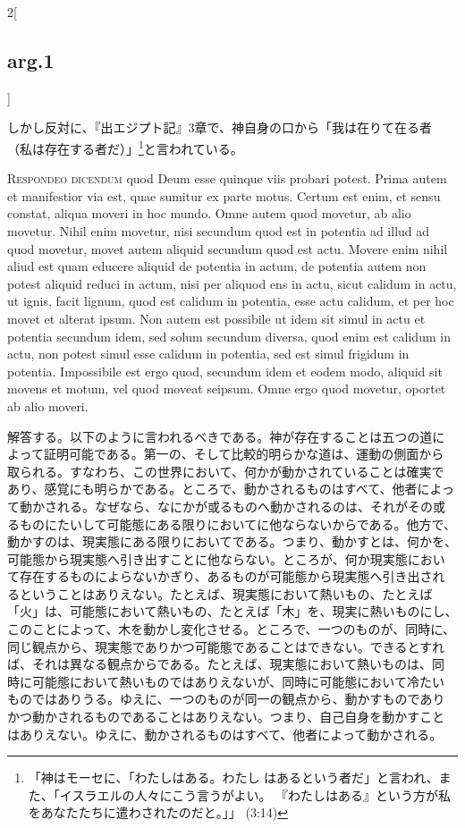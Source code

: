 \documentclass[paper=a4paper,fontsize=10pt,jafontsize=9pt,titlepage]{jlreq}
\begin{document}
\begin{paracol}{2}[\subsection{arg.1}]
\switchcolumn

しかし反対に、『出エジプト記』3章で、神自身の口から「我は在りて在る者
（私は存在する者だ）」\footnote{「神はモーセに、「わたしはある。わたし
はあるという者だ」と言われ、また、「イスラエルの人々にこう言うがよい。
『わたしはある』という方が私をあなたたちに遣わされたのだと。」」
(3:14)}と言われている。


{\scshape Respondeo dicendum} quod Deum esse quinque viis probari
potest. Prima autem et manifestior via est, quae sumitur ex parte
motus. Certum est enim, et sensu constat, aliqua moveri in hoc
mundo. Omne autem quod movetur, ab alio movetur. Nihil enim movetur,
nisi secundum quod est in potentia ad illud ad quod movetur, movet
autem aliquid secundum quod est actu. Movere enim nihil aliud est quam
educere aliquid de potentia in actum, de potentia autem non potest
aliquid reduci in actum, nisi per aliquod ens in actu, sicut calidum
in actu, ut ignis, facit lignum, quod est calidum in potentia, esse
actu calidum, et per hoc movet et alterat ipsum. Non autem est
possibile ut idem sit simul in actu et potentia secundum idem, sed
solum secundum diversa, quod enim est calidum in actu, non potest
simul esse calidum in potentia, sed est simul frigidum in
potentia. Impossibile est ergo quod, secundum idem et eodem modo,
aliquid sit movens et motum, vel quod moveat seipsum. Omne ergo quod
movetur, oportet ab alio moveri.

\switchcolumn

解答する。以下のように言われるべきである。神が存在することは五つの道に
よって証明可能である。第一の、そして比較的明らかな道は、運動の側面から
取られる。すなわち、この世界において、何かが動かされていることは確実で
あり、感覚にも明らかである。ところで、動かされるものはすべて、他者によっ
て動かされる。なぜなら、なにかが或るものへ動かされるのは、それがその或
るものにたいして可能態にある限りにおいてに他ならないからである。他方で、
動かすのは、現実態にある限りにおいてである。つまり、動かすとは、何かを、
可能態から現実態へ引き出すことに他ならない。ところが、何か現実態におい
て存在するものによらないかぎり、あるものが可能態から現実態へ引き出され
るということはありえない。たとえば、現実態において熱いもの、たとえば
「火」は、可能態において熱いもの、たとえば「木」を、現実に熱いものにし、
このことによって、木を動かし変化させる。ところで、一つのものが、同時に、
同じ観点から、現実態でありかつ可能態であることはできない。できるとすれ
ば、それは異なる観点からである。たとえば、現実態において熱いものは、同
時に可能態において熱いものではありえないが、同時に可能態において冷たい
ものではありうる。ゆえに、一つのものが同一の観点から、動かすものであり
かつ動かされるものであることはありえない。つまり、自己自身を動かすこと
はありえない。ゆえに、動かされるものはすべて、他者によって動かされる。


\end{paracol}
\end{document}
